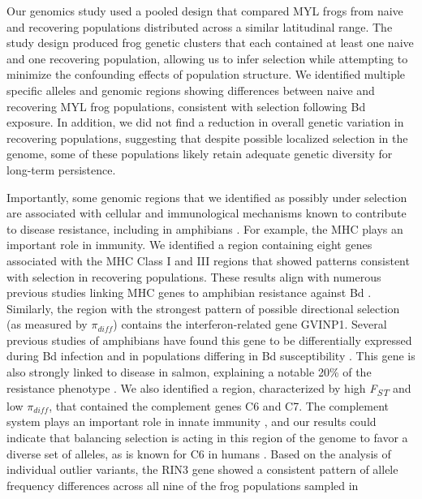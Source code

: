 \documentclass[9pt,twocolumn,twoside,lineno]{pnas-new}
\begin{document}
Our genomics study used a pooled design that compared MYL frogs from
naive and recovering populations distributed across a similar
latitudinal range. The study design produced frog genetic clusters that
each contained at least one naive and one recovering population,
allowing us to infer selection while attempting to minimize the
confounding effects of population structure. We identified multiple
specific alleles and genomic regions showing differences between naive
and recovering MYL frog populations, consistent with selection following
Bd exposure. In addition, we did not find a reduction in overall genetic
variation in recovering populations, suggesting that despite possible
localized selection in the genome, some of these populations likely
retain adequate genetic diversity for long-term persistence.

Importantly, some genomic regions that we identified as possibly under
selection are associated with cellular and immunological mechanisms
known to contribute to disease resistance, including in amphibians
\citep{zamudio2020}. For example, the MHC plays an important role in
immunity. We identified a region containing eight genes associated with
the MHC Class I and III regions that showed patterns consistent with
selection in recovering populations. These results align with numerous
previous studies linking MHC genes to amphibian resistance against Bd
\citep[e.g.,][]{savage2011, bataille2015}. Similarly, the region with
the strongest pattern of possible directional selection (as measured by
\(\pi_{diff}\)) contains the interferon-related gene GVINP1. Several
previous studies of amphibians have found this gene to be differentially
expressed during Bd infection \citep[e.g.,][]{grogan2018b, ellison2014}
and in populations differing in Bd susceptibility \citep{grogan2018b}.
This gene is also strongly linked to disease in salmon, explaining a
notable 20\% of the resistance phenotype \citep[i.e., gill damage and
amoebic load as heritable host resistance
traits,][]{robledo2020, robledo2018}. We also identified a region,
characterized by high \emph{F\textsubscript{ST}} and low \(\pi_{diff}\),
that contained the complement genes C6 and C7. The complement system
plays an important role in innate immunity \citep{rieraromo2016}, and
our results could indicate that balancing selection is acting in this
region of the genome to favor a diverse set of alleles, as is known for
C6 in humans \citep{soejima2005}. Based on the analysis of individual
outlier variants, the RIN3 gene showed a consistent pattern of allele
frequency differences across all nine of the frog populations sampled in
\end{document}
